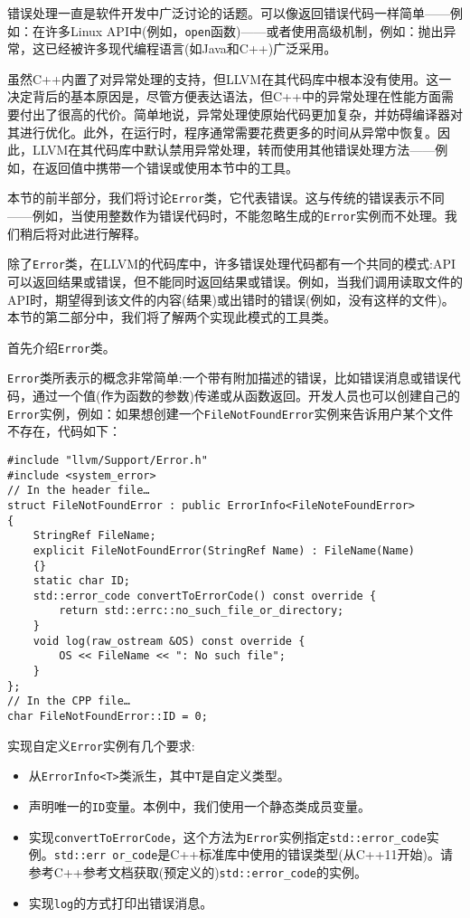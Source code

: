 
错误处理一直是软件开发中广泛讨论的话题。可以像返回错误代码一样简单——例如：在许多Linux API中(例如，\texttt{open}函数)——或者使用高级机制，例如：抛出异常，这已经被许多现代编程语言(如Java和C++)广泛采用。

虽然C++内置了对异常处理的支持，但LLVM在其代码库中根本没有使用。这一决定背后的基本原因是，尽管方便表达语法，但C++中的异常处理在性能方面需要付出了很高的代价。简单地说，异常处理使原始代码更加复杂，并妨碍编译器对其进行优化。此外，在运行时，程序通常需要花费更多的时间从异常中恢复。因此，LLVM在其代码库中默认禁用异常处理，转而使用其他错误处理方法——例如，在返回值中携带一个错误或使用本节中的工具。

本节的前半部分，我们将讨论\texttt{Error}类，它代表错误。这与传统的错误表示不同——例如，当使用整数作为错误代码时，不能忽略生成的\texttt{Error}实例而不处理。我们稍后将对此进行解释。

除了\texttt{Error}类，在LLVM的代码库中，许多错误处理代码都有一个共同的模式:API可以返回结果或错误，但不能同时返回结果或错误。例如，当我们调用读取文件的API时，期望得到该文件的内容(结果)或出错时的错误(例如，没有这样的文件)。本节的第二部分中，我们将了解两个实现此模式的工具类。

首先介绍\texttt{Error}类。


\texttt{Error}类所表示的概念非常简单:一个带有附加描述的错误，比如错误消息或错误代码，通过一个值(作为函数的参数)传递或从函数返回。开发人员也可以创建自己的\texttt{Error}实例，例如：如果想创建一个\texttt{FileNotFoundError}实例来告诉用户某个文件不存在，代码如下：

\begin{lstlisting}[style=styleCXX]
#include "llvm/Support/Error.h"
#include <system_error>
// In the header file…
struct FileNotFoundError : public ErrorInfo<FileNoteFoundError>
{
	StringRef FileName;
	explicit FileNotFoundError(StringRef Name) : FileName(Name)
	{}
	static char ID;
	std::error_code convertToErrorCode() const override {
		return std::errc::no_such_file_or_directory;
	}
	void log(raw_ostream &OS) const override {
		OS << FileName << ": No such file";
	}
};
// In the CPP file…
char FileNotFoundError::ID = 0;
\end{lstlisting}

实现自定义\texttt{Error}实例有几个要求:

\begin{itemize}
\item 从\texttt{ErrorInfo<T>}类派生，其中\texttt{T}是自定义类型。
\item 声明唯一的\texttt{ID}变量。本例中，我们使用一个静态类成员变量。
\item 实现\texttt{convertToErrorCode}，这个方法为\texttt{Error}实例指定\texttt{std::error\_code}实例。\texttt{std::err or\_code}是C++标准库中使用的错误类型(从C++11开始)。请参考C++参考文档获取(预定义的)\texttt{std::error\_code}的实例。
\item 实现\texttt{log}的方式打印出错误消息。
\end{itemize}

